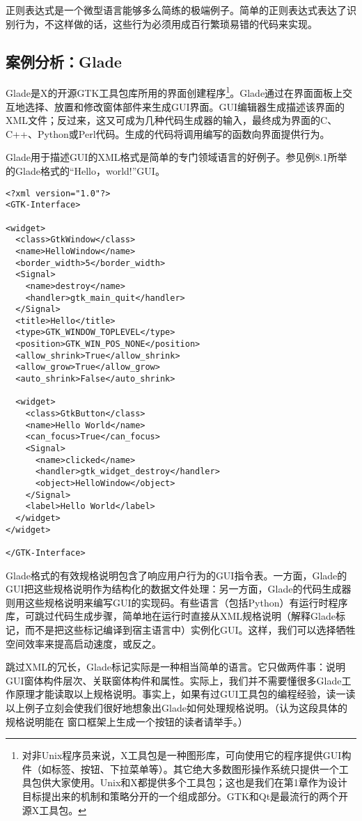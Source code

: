 \documentclass[12pt,oneside]{book}
\begin{document}
\begin{common-format}
正则表达式是一个微型语言能够多么简练的极端例子。简单的正则表达式表达了识别行为，不这样做的话，这些行为必须用成百行繁琐易错的代码来实现。

\subsection{案例分析：Glade}
Glade是X的开源GTK工具包库所用的界面创建程序\footnote{对非Unix程序员来说，X工具包是一种图形库，可向使用它的程序提供GUI构件（如标签、按钮、下拉菜单等）。其它绝大多数图形操作系统只提供一个工具包供大家使用。Unix和X都提供多个工具包；这也是我们在第1章作为设计目标提出来的机制和策略分开的一个组成部分。GTK和Qt是最流行的两个开源X工具包。}。Glade通过在界面面板上交互地选择、放置和修改窗体部件来生成GUI界面。GUI编辑器生成描述该界面的XML文件；反过来，这又可成为几种代码生成器的输入，最终成为界面的C、C++、Python或Perl代码。生成的代码将调用编写的函数向界面提供行为。

Glade用于描述GUI的XML格式是简单的专门领域语言的好例子。参见例8.1所举的Glade格式的“Hello，world!”GUI。
\begin{Verbatim}[label=例 8.1 Glade "Hello， World"]
<?xml version="1.0"?>
<GTK-Interface>

<widget>
  <class>GtkWindow</class>
  <name>HelloWindow</name>
  <border_width>5</border_width>
  <Signal>
    <name>destroy</name>
    <handler>gtk_main_quit</handler>
  </Signal>
  <title>Hello</title>
  <type>GTK_WINDOW_TOPLEVEL</type>
  <position>GTK_WIN_POS_NONE</position>
  <allow_shrink>True</allow_shrink>
  <allow_grow>True</allow_grow>
  <auto_shrink>False</auto_shrink>

  <widget>
    <class>GtkButton</class>
    <name>Hello World</name>
    <can_focus>True</can_focus>
    <Signal>
      <name>clicked</name>
      <handler>gtk_widget_destroy</handler>
      <object>HelloWindow</object>
    </Signal>
    <label>Hello World</label>
  </widget>
</widget>

</GTK-Interface>
\end{Verbatim}

Glade格式的有效规格说明包含了响应用户行为的GUI指令表。一方面，Glade的GUI把这些规格说明作为结构化的数据文件处理：另一方面，Glade的代码生成器则用这些规格说明来编写GUI的实现码。有些语言（包括Python）有运行时程序库，可跳过代码生成步骤，简单地在运行时直接从XML规格说明（解释Glade标记，而不是把这些标记编译到宿主语言中）实例化GUI。这样，我们可以选择牺牲空间效率来提高启动速度，或反之。

跳过XML的冗长，Glade标记实际是一种相当简单的语言。它只做两件事：说明GUI窗体构件层次、关联窗体构件和属性。实际上，我们并不需要懂很多Glade工作原理才能读取以上规格说明。事实上，如果有过GUI工具包的编程经验，读一读以上例子立刻会使我们很好地想象出Glade如何处理规格说明。（认为这段具体的规格说明能在
窗口框架上生成一个按钮的读者请举手。）


\end{common-format}
\end{document}
